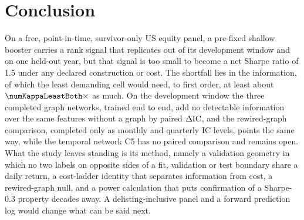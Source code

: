 \section{Conclusion}\label{sec:conclusion}

On a free, point-in-time, survivor-only US equity panel, a pre-fixed shallow booster carries a rank signal that replicates out of its development window and on one held-out year, but that signal is too small to become a net Sharpe ratio of 1.5 under any declared construction or cost. The shortfall lies in the information, of which the least demanding cell would need, to first order, at least about $\numKappaLeastBoth\times$ as much. On the development window the three completed graph networks, trained end to end, add no detectable information over the same features without a graph by paired $\Delta\mathrm{IC}$, and the rewired-graph comparison, completed only as monthly and quarterly IC levels, points the same way, while the temporal network C5 has no paired comparison and remains open. What the study leaves standing is its method, namely a validation geometry in which no two labels on opposite sides of a fit, validation or test boundary share a daily return, a cost-ladder identity that separates information from cost, a rewired-graph null, and a power calculation that puts confirmation of a Sharpe-0.3 property decades away. A delisting-inclusive panel and a forward prediction log would change what can be said next.
